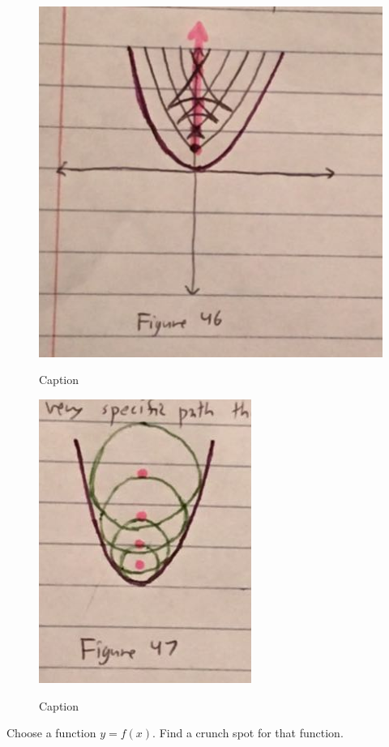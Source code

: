 \begin{figure}[H]
  \centering
  \begin{minipage}[b]{\w}
    \centering
    \label{divot:7}
    \includegraphics[height=\fh]{img/12-divot/07.png}
    \caption{Caption}
  \end{minipage}
  \begin{minipage}[b]{\w}
    \centering
    \label{divot:8}
    \includegraphics[height=\fh]{img/12-divot/08.png}
    \caption{Caption}
  \end{minipage}
\end{figure}

Choose a function $y = f(x)$. Find a crunch spot for that function.

